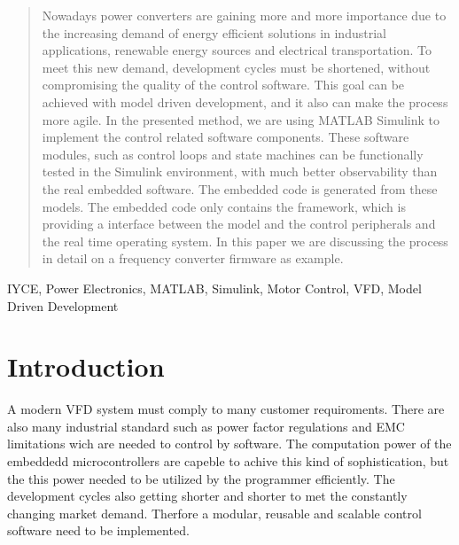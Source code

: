 \begin{abstract}
Nowadays power converters are gaining more and more importance due to the increasing demand of energy efficient solutions in industrial applications, renewable energy sources and electrical transportation. To meet this new demand, development cycles must be shortened, without compromising the quality of the control software. This goal can be achieved with model driven development, and it also can make the process more agile. In the presented method, we are using MATLAB Simulink to implement the control related software components. These software modules, such as control loops and state machines can be functionally tested in the Simulink environment, with much better observability than the real embedded software. The embedded code is generated from these models. The embedded code only contains the framework, which is providing a interface between the model and the control peripherals and the real time operating system. In this paper we are discussing the process in detail on a frequency converter firmware as example.
\end{abstract}

\begin{IEEEkeywords}
IYCE, Power Electronics, MATLAB, Simulink, Motor Control, VFD, Model Driven Development
\end{IEEEkeywords}


%
\IEEEpeerreviewmaketitle


\section{Introduction}
A modern VFD system must comply to many customer requiroments. There are also many industrial standard such as power factor regulations and EMC limitations wich are needed to control by software. The computation power of the embeddedd microcontrollers are capeble to achive this kind of sophistication, but the this power needed to be utilized by the programmer efficiently. The development cycles also getting shorter and shorter to met the constantly changing market demand. Therfore a modular, reusable and scalable control software need to be implemented.

